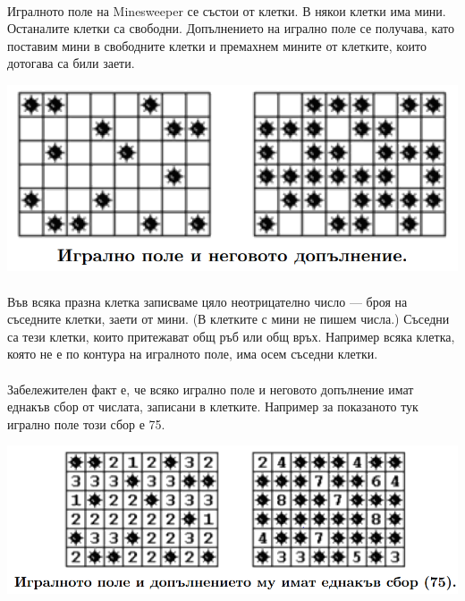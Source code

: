 \documentclass[12pt]{article}
\begin{document}
\paragraph*{}
Игралното поле на Minesweeper се състои от клетки. В някои клетки има мини. Останалите клетки са свободни. Допълнението на игрално поле се получава, като поставим мини в свободните клетки и премахнем мините от клетките, които дотогава са били заети.
\begin{center}
    \includegraphics[scale = 0.5]{minesweeper-1}
\end{center}
\paragraph*{}
Във всяка празна клетка записваме цяло неотрицателно число — броя на съседните клетки, заети от мини. (В клетките с мини не пишем числа.) Съседни са тези клетки, които притежават общ ръб или общ връх. Например всяка клетка, която не е по контура на игралното поле, има осем съседни клетки.
\paragraph*{}
Забележителен факт е, че всяко игрално поле и неговото допълнение имат еднакъв сбор от числата, записани в клетките. Например за показаното тук игрално поле този сбор е 75.
\begin{center}
    \includegraphics[scale = 0.5]{minesweeper-2}
\end{center}
\end{document}
